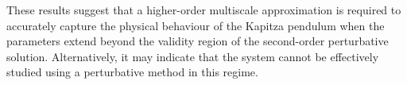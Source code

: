 These results suggest that a higher-order multiscale approximation is required to accurately capture the physical behaviour of the Kapitza pendulum when the parameters extend beyond the validity region of the second-order perturbative solution. Alternatively, it may indicate that the system cannot be effectively studied using a perturbative method in this regime.
